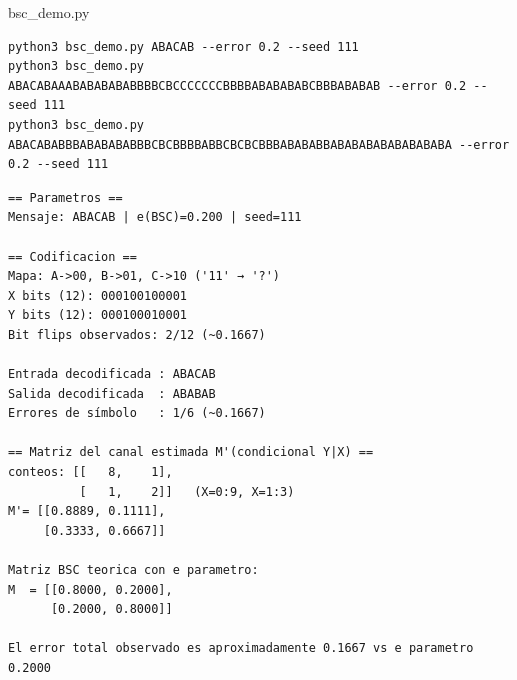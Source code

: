 \documentclass{beamer}
\theoremstyle{plain}
\theoremstyle{example}
\theoremstyle{example}
\begin{document}
\begin{frame}[fragile]  {bsc\_demo.py}\footnotesize  

\tiny
\begin{verbatim}  
python3 bsc_demo.py ABACAB --error 0.2 --seed 111
python3 bsc_demo.py ABACABAAABABABABABBBBCBCCCCCCCBBBBABABABABCBBBABABAB --error 0.2 --seed 111
python3 bsc_demo.py ABACABABBBABABABABBBCBCBBBBABBCBCBCBBBABABABBABABABABABABABABA --error 0.2 --seed 111
\end{verbatim}

\begin{verbatim}  
== Parametros ==
Mensaje: ABACAB | e(BSC)=0.200 | seed=111

== Codificacion ==
Mapa: A->00, B->01, C->10 ('11' → '?')
X bits (12): 000100100001
Y bits (12): 000100010001
Bit flips observados: 2/12 (~0.1667)

Entrada decodificada : ABACAB
Salida decodificada  : ABABAB
Errores de símbolo   : 1/6 (~0.1667)

== Matriz del canal estimada M'(condicional Y|X) ==
conteos: [[   8,    1], 
          [   1,    2]]   (X=0:9, X=1:3)
M'= [[0.8889, 0.1111], 
     [0.3333, 0.6667]]

Matriz BSC teorica con e parametro:
M  = [[0.8000, 0.2000], 
      [0.2000, 0.8000]]

El error total observado es aproximadamente 0.1667 vs e parametro 0.2000
\end{verbatim}

\end{frame} 
\end{document}
